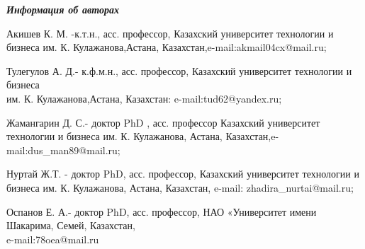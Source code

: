 \emph{{\bfseries Информация об авторах}}
\begin{noparindent}
Акишев К. М. -к.т.н., асс. профессор, Казахский университет технологии и
бизнеса им. К. Кулажанова,Астана, Казахстан,e-mail:akmail04cx@mail.ru;

Тулегулов А. Д.- к.ф.м.н., асс. профессор, Казахский университет
технологии и бизнеса \\им. К. Кулажанова,Астана, Казахстан:
e-mail:tud62@yandex.ru;

Жамангарин Д. С.- доктор PhD , асс. профессор Казахский университет
технологии и бизнеса им. К. Кулажанова, Астана,
Казахстан,e-mail:dus\_man89@mail.ru;

Нуртай Ж.Т. - доктор PhD, асс. профессор, Казахский университет
технологии и бизнеса им. К. Кулажанова, Астана, Казахстан, e-mail: zhadira\_nurtai@mail.ru;

Оспанов Е. А.- доктор PhD, асс. профессор, НАО «Университет имени
Шакарима, Семей, Казахстан, \\e-mail:78oea@mail.ru
\end{noparindent}
